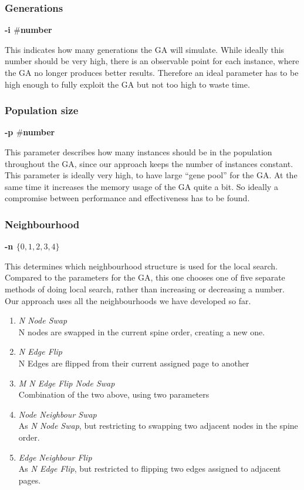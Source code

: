 \documentclass [11pt]{article}
\begin{document}
\subsubsection{Generations} \textbf{-i $\#$number} 

This indicates how many generations the GA will simulate. While ideally this number should be very high, there is an observable point for each instance, where the GA no longer produces better results. Therefore an ideal parameter has to be high enough to fully exploit the GA but not too high to waste time. 

\subsubsection{Population size} \textbf{-p $\#$number}

This parameter describes how many instances should be in the population throughout the GA, since our approach keeps the number of instances constant. This parameter is ideally very high, to have large ``gene pool'' for the GA. At the same time it increases the memory usage of the GA quite a bit. So ideally a compromise between performance and effectiveness has to be found. 

\subsubsection{ Neighbourhood} \textbf{-n $\{ 0,1,2,3,4\} $}

This determines which neighbourhood structure is used for the local search. Compared to the parameters for the GA, this one chooses one of five separate methods of doing local search, rather than increasing or decreasing a number. Our approach uses all the neighbourhoods we have developed so far. 

\begin{enumerate}\addtocounter{enumi}{-1}
  \item \emph{N Node Swap} \\ 
  N nodes are swapped in the current spine order, creating a new one. 
  \item\emph{ N Edge Flip} \\ 
  N Edges are flipped from their current assigned page to another 
  \item \emph{M N Edge Flip Node Swap} \\
  Combination of the two above, using two parameters 
  \item \emph{Node Neighbour Swap }\\ 
  As \emph{N Node Swap}, but restricting to swapping two adjacent nodes in the spine order. 
  \item  \emph{Edge Neighbour Flip} \\
  As \emph{N Edge Flip}, but restricted to flipping two edges assigned to adjacent pages. 
\end{enumerate}
\end{document}
